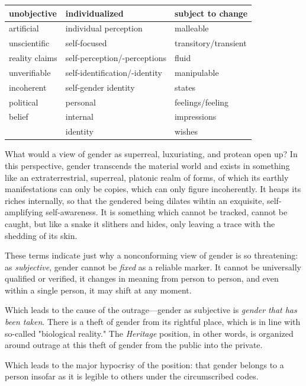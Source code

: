 \documentclass[11pt]{article}
\begin{document}
\begin{enumerate}
\begin{center}
\begin{tabular}{lll}
unobjective & individualized & subject to change\\[0pt]
\hline
artificial & individual perception & malleable\\[0pt]
unscientific & self-focused & transitory/transient\\[0pt]
reality claims & self-perception/-perceptions & fluid\\[0pt]
unverifiable & self-identification/-identity & manipulable\\[0pt]
incoherent & self-gender identity & states\\[0pt]
political & personal & feelings/feeling\\[0pt]
belief & internal & impressions\\[0pt]
 & identity & wishes\\[0pt]
\end{tabular}
\end{center}

What would a view of gender as superreal, luxuriating, and protean
open up? In this perspective, gender transcends the material world and
exists in something like an extraterrestrial, superreal, platonic
realm of forms, of which its earthly manifestations can only be
copies, which can only figure incoherently. It heaps its riches
internally, so that the gendered being dilates wihtin an exquisite,
self-amplifying self-awareness. It is something which cannot be
tracked, cannot be caught, but like a snake it slithers and hides,
only leaving a trace with the shedding of its skin.

These terms indicate just why a nonconforming view of gender is so
threatening: as \emph{subjective}, gender cannot be \emph{fixed} as a reliable
marker. It cannot be universally qualified or verified, it changes in
meaning from person to person, and even within a single person, it may
shift at any moment.

Which leads to the cause of the outrage---gender as subjective is
\emph{gender that has been taken}. There is a theft of gender from its
rightful place, which is in line with so-called "biological reality."
The \emph{Heritage} position, in other words, is organized around outrage
at this theft of gender from the public into the private.

Which leads to the major hypocrisy of the position: that gender
belongs to a person insofar as it is legible to others under the
circumscribed codes.


\end{enumerate}
\end{document}
